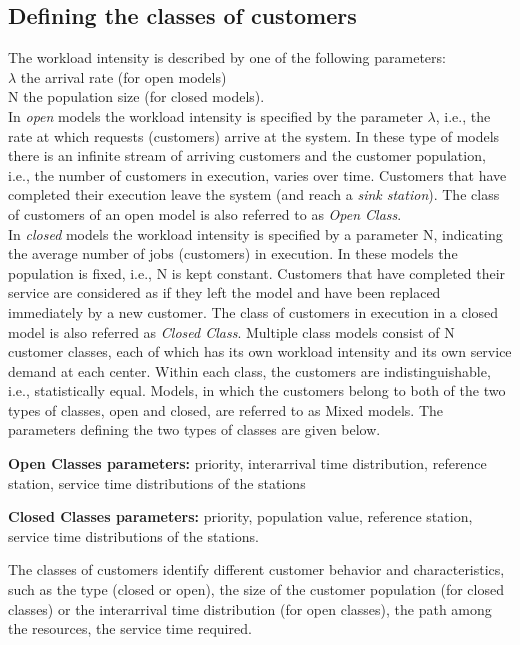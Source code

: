 \subsection{Defining the classes of customers} \label{sec:DefineClasses}
 The workload intensity is described by one of the following
 parameters:\\
$\lambda$ the arrival rate (for open models)\\
N the population size (for closed models).\\
In \emph{open} models the workload intensity is specified by the
parameter $\lambda$, i.e., the rate at which requests (customers)
arrive at the system. In these type of models there is an infinite
stream of arriving customers and the customer population, i.e.,
the number of customers in execution, varies over time. Customers
that have completed their execution leave the system (and reach a
\emph{sink station}). The class of customers of an open model is
also referred to as \emph{Open Class}.\\
 In \emph{closed} models the workload intensity is specified by a
parameter N, indicating the average number of jobs (customers) in
execution. In these models the population is fixed, i.e., N is
kept constant. Customers that have completed their service are
considered as if they left the model and have been replaced
immediately by a new customer. The class of customers in execution
in a closed model is also referred as \emph{Closed Class}.
 Multiple class models consist of N customer classes, each of which
 has its own workload intensity and its own service demand at each center.
 Within each class, the customers are indistinguishable, i.e., statistically
 equal. Models, in which the customers belong to both of the two types of
 classes, open and closed, are referred to as Mixed models.
The parameters defining the two types of classes are given below.
\begin{itemize*}
\item \textbf{Open Classes parameters:} priority, interarrival
time distribution, reference station, service time distributions
of the stations \item \textbf{Closed Classes parameters:}
priority, population value, reference station, service time
distributions of the stations. \end{itemize*}

 The classes
of customers identify different customer behavior and
characteristics, such as the type (closed or open), the size of
the customer population (for closed classes) or the interarrival
time distribution (for open classes), the path among the
resources, the service time required.

